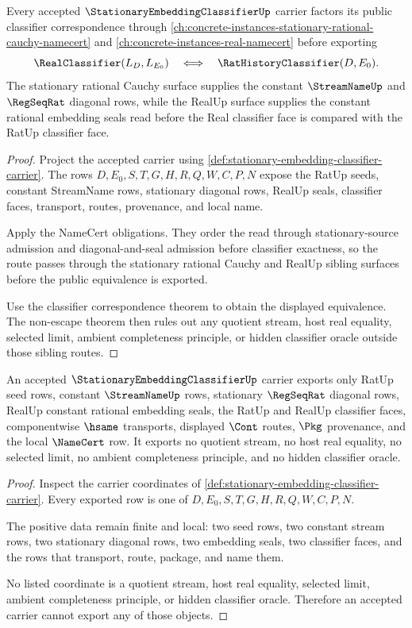 \begin{theorem}
\label{thm:stationary-embedding-classifier-real-completion-link}
Every accepted $\StationaryEmbeddingClassifierUp$ carrier factors its public classifier correspondence through \autoref{ch:concrete-instances-stationary-rational-cauchy-namecert} and \autoref{ch:concrete-instances-real-namecert} before exporting
$$
\RealClassifier(L_D,L_{E_0})
\quad\Longleftrightarrow\quad
\RatHistoryClassifier(D,E_0).
$$
The stationary rational Cauchy surface supplies the constant $\StreamNameUp$ and $\RegSeqRat$ diagonal rows, while the RealUp surface supplies the constant rational embedding seals read before the Real classifier face is compared with the RatUp classifier face.
\end{theorem}
\begin{proof}
Project the accepted carrier using \autoref{def:stationary-embedding-classifier-carrier}. The rows $D,E_0,S,T,G,H,R,Q,W,C,P,N$ expose the RatUp seeds, constant StreamName rows, stationary diagonal rows, RealUp seals, classifier faces, transport, routes, provenance, and local name.

Apply the NameCert obligations. They order the read through stationary-source admission and diagonal-and-seal admission before classifier exactness, so the route passes through the stationary rational Cauchy and RealUp sibling surfaces before the public equivalence is exported.

Use the classifier correspondence theorem to obtain the displayed equivalence. The non-escape theorem then rules out any quotient stream, host real equality, selected limit, ambient completeness principle, or hidden classifier oracle outside those sibling routes.
\end{proof}

\begin{theorem}
\label{thm:stationary-embedding-classifier-nonescape}
An accepted $\StationaryEmbeddingClassifierUp$ carrier exports only RatUp seed rows, constant $\StreamNameUp$ rows, stationary $\RegSeqRat$ diagonal rows, RealUp constant rational embedding seals, the RatUp and RealUp classifier faces, componentwise $\hsame$ transports, displayed $\Cont$ routes, $\Pkg$ provenance, and the local $\NameCert$ row. It exports no quotient stream, no host real equality, no selected limit, no ambient completeness principle, and no hidden classifier oracle.
\end{theorem}
\begin{proof}
Inspect the carrier coordinates of \autoref{def:stationary-embedding-classifier-carrier}. Every exported row is one of $D,E_0,S,T,G,H,R,Q,W,C,P,N$.

The positive data remain finite and local: two seed rows, two constant stream rows, two stationary diagonal rows, two embedding seals, two classifier faces, and the rows that transport, route, package, and name them.

No listed coordinate is a quotient stream, host real equality, selected limit, ambient completeness principle, or hidden classifier oracle. Therefore an accepted carrier cannot export any of those objects.
\end{proof}


